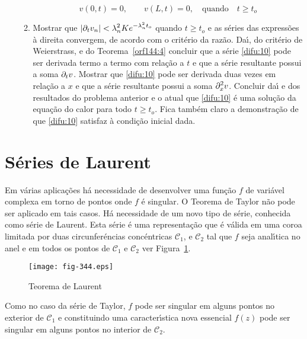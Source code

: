 \begin{enumerate}[label=\rm{(\arabic*)}]
\begin{enumerate}[label=(\alph*)]
\begin{equation}
v(0,t)=0,\qquad v(L,t)=0,\quad \text{quando}\quad t\geq t_o
\end{equation}
\item Mostrar que $\displaystyle{\left|\partial_t v_n\right|
<\lambda_n^2Ke^{-\lambda_{n}^2t_o}}$ quando $t\geq t_o$ e as s\'{e}ries
das express\~{o}es \`{a} direita convergem, de acordo com o crit\'{e}rio da
raz\~{a}o. Da\'{\i}, do crit\'{e}rio de Weierstrass, e do
Teorema~\ref{orf144:4} concluir que a s\'{e}rie \eqref{difu:10} pode
ser derivada termo a termo com rela\c{c}\~{a}o a $t$ e que a s\'{e}rie
resultante possui a soma $\displaystyle{\partial_t v}$.
Mostrar que \eqref{difu:10} pode ser derivada duas vezes em
rela\c{c}\~{a}o a $x$ e que a s\'{e}rie resultante possui a soma
$\displaystyle{\partial^2_x v}$. Concluir da\'{\i} e dos
resultados do problema anterior e o atual  que \eqref{difu:10} \'{e}
uma solu\c{c}\~{a}o da equa\c{c}\~{a}o do calor para todo $t\geq t_o$. Fica tamb\'{e}m
claro a demonstra\c{c}\~{a}o de que \eqref{difu:10} satisfaz \`{a} condi\c{c}\~{a}o
inicial dada.
\end{enumerate}
\end{enumerate}

\section{S\'{e}ries de Laurent}
Em v\'{a}rias aplica\c{c}\~{o}es h\'{a} necessidade de desenvolver uma fun\c{c}\~{a}o
$f$ de vari\'{a}vel complexa em torno de pontos onde $f$ \'{e} singular. O Teorema de
Taylor n\~{a}o pode ser aplicado em tais casos. H\'{a} necessidade de um
novo tipo de s\'{e}rie, conhecida como s\'{e}rie de Laurent. Esta s\'{e}rie \'{e}
uma representa\c{c}\~{a}o que \'{e} v\'{a}lida em uma coroa limitada por duas
circunfer\'{e}ncias conc\'{e}ntricas $\mathcal{C}_1$, e $\mathcal{C}_2$
tal que $f$ seja anal\'{\i}tica no anel e em todos os pontos de
$\mathcal{C}_1$ e $\mathcal{C}_2$ ver Figura~\ref{fig-344}.
\begin{figure}[H]
\centering
\texttt{[image: fig-344.eps]}
\caption{Teorema de Laurent}
\label{fig-344}
\end{figure}

Como no caso da s\'{e}rie de Taylor, $f$ pode ser singular em
alguns pontos no exterior de $\mathcal{C}_1$ e constituindo uma
caracter\'{\i}stica nova essencial $f(z)$ pode ser singular em alguns
pontos no interior de $\mathcal{C}_2$.

